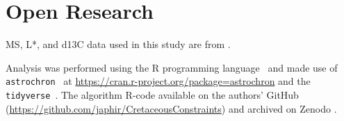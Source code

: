 \documentclass[]{agujournal2019}
\begin{document}


%
%

%

%



\section*{Open Research}

\Gls{MS}, \gls{L*}, and \gls{d13C} data used in this study are from .

Analysis was performed using the R programming language~\cite{RCoreTeam2024} and made use of \texttt{astrochron}~\cite{Meyers2014} at \url{https://cran.r-project.org/package=astrochron} and the \texttt{tidyverse}~\cite{Wickham2019}.
The algorithm R-code  available on the authors' GitHub (\url{https://github.com/japhir/CretaceousConstraints}) and  archived on Zenodo \cite{Kocken2024a}.
\end{document}
